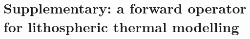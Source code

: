\chapter{Supplementary: a forward operator for lithospheric thermal modelling}
\label{c:ThermModel}
